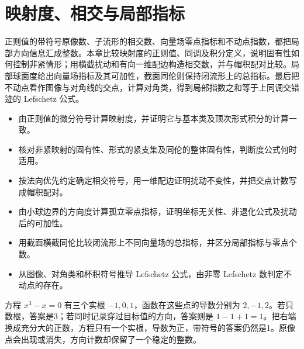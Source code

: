 
% 
% 

\chapter{映射度、相交与局部指标}
\label{g2:ch:16}

\begin{chapterabstract}
	正则值的带符号原像数、子流形的相交数、向量场零点指标和不动点指数，都把局部方向信息汇成整数。本章比较映射度的正则值、同调及积分定义，说明固有性如何控制非紧情形；用横截扰动和有向一维配边构造相交数，并与帽积配对比较。局部球面度给出向量场指标及其可加性，截面同伦则保持闭流形上的总指标。最后把不动点看作图像与对角线的交点，计算对角类，得到局部指数之和等于上同调交错迹的 Lefschetz 公式。
\end{chapterabstract}

\begin{learninggoals}
	\begin{itemize}
		\item 由正则值的微分符号计算映射度，并证明它与基本类及顶次形式积分的计算一致。
		\item 核对非紧映射的固有性、形式的紧支集及同伦的整体固有性，判断度公式何时适用。
		\item 按法向优先约定确定相交符号，用一维配边证明扰动不变性，并把交点计数写成帽积配对。
		\item 由小球边界的方向度计算孤立零点指标，证明坐标无关性、非退化公式及扰动后的可加性。
		\item 用截面横截同伦比较闭流形上不同向量场的总指标，并区分局部指标与零点个数。
		\item 从图像、对角类和杯积符号推导 Lefschetz 公式，由非零 Lefschetz 数判定不动点的存在。
	\end{itemize}
\end{learninggoals}

方程 \(x^3-x=0\) 有三个实根 \(-1,0,1\)，函数在这些点的导数分别为 \(2,-1,2\)。若只数根，答案是3；若同时记录穿过目标值的方向，答案则是 \(1-1+1=1\)。把右端换成充分大的正数，方程只有一个实根，导数为正，带符号的答案仍然是1。原像点会出现或消失，方向计数却保留了一个稳定的整数。

\ProseParagraphBreak

